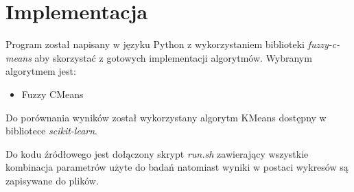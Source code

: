 \documentclass{classrep}
\begin{document}
    \section{Implementacja} {
        Program został napisany w języku Python z wykorzystaniem biblioteki
        \textit{fuzzy-c-means}\cite{fuzzy_c_means} aby skorzystać z gotowych
        implementacji algorytmów. Wybranym algorytmem jest:
        \begin{itemize}
            \item Fuzzy CMeans
        \end{itemize}

        Do porównania wyników został wykorzystany algorytm KMeans dostępny w bibliotece
        \textit{scikit-learn}\cite{sklearn}.

        Do kodu źródłowego jest dołączony skrypt \textit{run.sh} zawierający wszystkie
        kombinacja parametrów użyte do badań natomiast wyniki w postaci wykresów są
        zapisywane do plików.
    }
\end{document}
